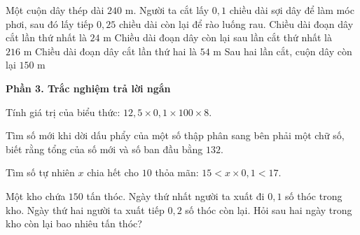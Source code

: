 \begin{ex} %
Một cuộn dây thép dài $240\text{ m}$. Người ta cắt lấy $0{,}1$ chiều dài sợi dây để làm móc phơi, sau đó lấy tiếp $0{,}25$ chiều dài còn lại để rào luống rau.
\choiceTF
{\True Chiều dài đoạn dây cắt lần thứ nhất là $24\text{ m}$}
{\True Chiều dài đoạn dây còn lại sau lần cắt thứ nhất là $216\text{ m}$}
{\True Chiều dài đoạn dây cắt lần thứ hai là $54\text{ m}$}
{Sau hai lần cắt, cuộn dây còn lại $150\text{ m}$}
\end{ex}

\textbf{Phần 3. Trắc nghiệm trả lời ngắn}

\begin{ex} %
Tính giá trị của biểu thức: $12{,}5 \times 0{,}1 \times 100 \times 8$.
\end{ex}

\begin{ex} %
Tìm số mới khi dời dấu phẩy của một số thập phân sang bên phải một chữ số, biết rằng tổng của số mới và số ban đầu bằng $132$.
\end{ex}

\begin{ex} %
Tìm số tự nhiên $x$ chia hết cho $10$ thỏa mãn: $15 < x \times 0{,}1 < 17$.
\end{ex}

\begin{ex} %
Một kho chứa $150$ tấn thóc. Ngày thứ nhất người ta xuất đi $0{,}1$ số thóc trong kho. Ngày thứ hai người ta xuất tiếp $0{,}2$ số thóc còn lại. Hỏi sau hai ngày trong kho còn lại bao nhiêu tấn thóc?
\end{ex}

